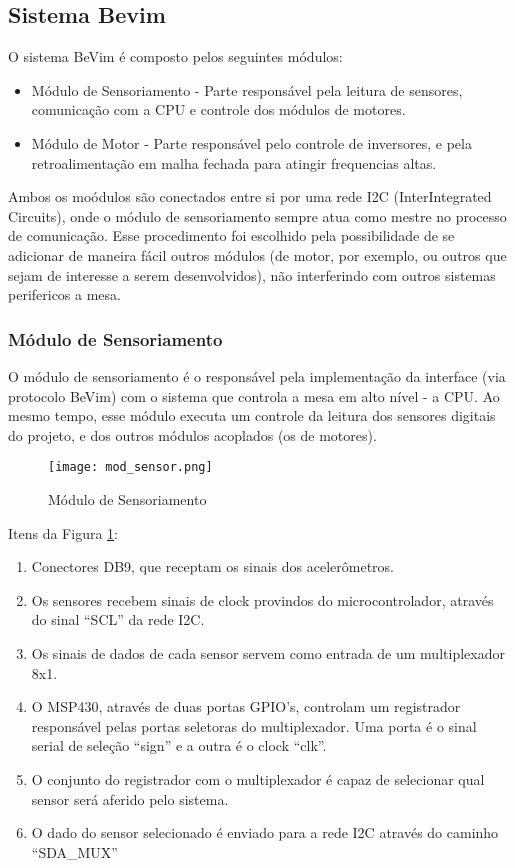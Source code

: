 \subsection{Sistema Bevim}

O sistema BeVim é composto pelos seguintes módulos:

\begin{itemize}
	\item Módulo de Sensoriamento - Parte responsável pela leitura de sensores, comunicação com a CPU e controle dos módulos de motores. 
	\item Módulo de Motor - Parte responsável pelo controle de inversores, e pela retroalimentação em malha fechada para atingir frequencias altas.
\end{itemize}

Ambos os moódulos são conectados entre si por uma rede I2C (InterIntegrated Circuits), onde o módulo de sensoriamento sempre atua como mestre no processo de comunicação. Esse procedimento foi escolhido pela possibilidade de se adicionar de maneira fácil outros módulos (de motor, por exemplo, ou outros que sejam de interesse a serem desenvolvidos), não interferindo com outros sistemas perifericos a mesa.

\subsubsection{Módulo de Sensoriamento}
O módulo de sensoriamento é o responsável pela implementação da interface (via protocolo BeVim) com o sistema que controla a mesa em alto nível - a CPU. Ao mesmo tempo, esse módulo executa um controle da leitura dos sensores digitais do projeto, e dos outros módulos acoplados (os de motores).

\begin{figure}[htbp]
	\centering
		\texttt{[image: mod\_sensor.png]}
	\caption{Módulo de Sensoriamento}
	\label{mod_sensor}
\end{figure}

Itens da Figura \ref{mod_sensor}:

\begin{enumerate}
	\item Conectores DB9, que receptam os sinais dos acelerômetros.
	\item Os sensores recebem sinais de clock provindos do microcontrolador, através do sinal “SCL” da rede I2C.
	\item Os sinais de dados de cada sensor servem como entrada de um multiplexador 8x1.
	\item O MSP430, através de duas portas GPIO's, controlam um registrador responsável pelas portas seletoras do multiplexador. Uma porta é o sinal serial de seleção “sign” e a outra é o clock “clk”.
	\item O conjunto do registrador com o multiplexador é capaz de selecionar qual sensor será aferido pelo sistema.
	\item O dado do sensor selecionado é enviado para a rede I2C através do caminho “SDA_MUX”
\end{enumerate}

